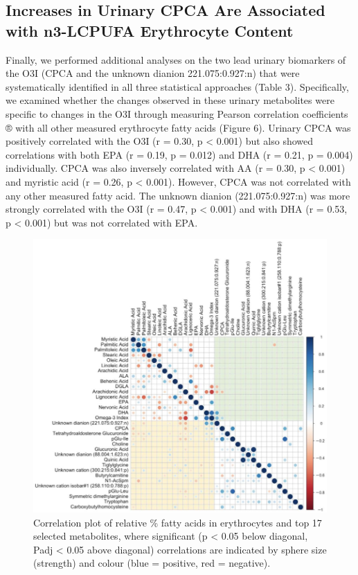 \documentclass[journal=jacsat,manuscript=article]{achemso}
\begin{document}
\subsection{Increases in Urinary CPCA Are Associated with n3-LCPUFA
Erythrocyte
Content}\label{increases-in-urinary-cpca-are-associated-with-n3-lcpufa-erythrocyte-content}

Finally, we performed additional analyses on the two lead urinary
biomarkers of the O3I (CPCA and the unknown dianion 221.075:0.927:n)
that were systematically identified in all three statistical approaches
(Table 3). Specifically, we examined whether the changes observed in
these urinary metabolites were specific to changes in the O3I through
measuring Pearson correlation coefficients ® with all other measured
erythrocyte fatty acids (Figure 6). Urinary CPCA was positively
correlated with the O3I (r = 0.30, p \textless{} 0.001) but also showed
correlations with both EPA (r = 0.19, p = 0.012) and DHA (r = 0.21, p =
0.004) individually. CPCA was also inversely correlated with AA (r =
0.30, p \textless{} 0.001) and myristic acid (r = 0.26, p \textless{}
0.001). However, CPCA was not correlated with any other measured fatty
acid. The unknown dianion (221.075:0.927:n) was more strongly correlated
with the O3I (r = 0.47, p \textless{} 0.001) and with DHA (r = 0.53, p
\textless{} 0.001) but was not correlated with EPA.

\begin{figure}
\includegraphics[width=0.8\linewidth]{../Figures/Most_relevant_metabolites} \caption{Correlation plot of relative \% fatty acids in erythrocytes and top 17 selected metabolites, where significant (p < 0.05 below diagonal, Padj < 0.05 above diagonal) correlations are indicated by sphere size (strength) and colour (blue = positive, red = negative).}\label{fig:unnamed-chunk-4}
\end{figure}
\end{document}
